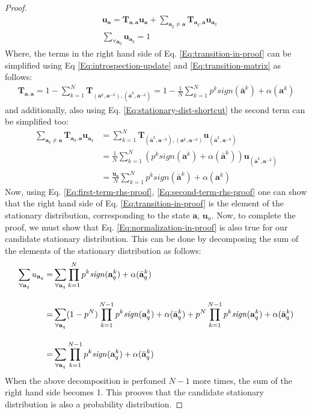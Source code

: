 \documentclass[11pt]{article}
\theoremstyle{plainCl1}
\theoremstyle{plainCl2}
\newcommand{\abf}{\mathbf{a}}
\newcommand{\T}{\mathbf{T}}
\newcommand{\ubf}{\mathbf{u}}
\begin{document}
\begin{proof}
\begin{align}
&\ubf_\abf = \T_{\abf,\abf} \ubf_\abf  + \sum_{\abf_q \neq \abf} \T_{\abf_q, \abf} \ubf_{\abf_q}  \\[10pt] 
\label{Eq:normalization-in-proof}
&\sum_{\forall \abf_q} \ubf_{\abf_q}= 1
\end{align}
Where, the terms in the right hand side of Eq. \ref{Eq:transition-in-proof} can be simplified using Eq \ref{Eq:introspection-update} and \ref{Eq:transition-matrix} as follows:
\begin{eqnarray}
\T_{\abf,\abf} = 1 - \sum_{k=1}^{N} \T_{(\abf^k, \abf^{-k}), (\bar{\abf}^k,\abf^{-k})} = 1 - \frac{1}{N} \sum_{k=1}^{N} p^k \textit{sign}(\bar{\abf}^k) + \alpha(\abf^k)
\label{Eq:first-term-rhs-proof}
\end{eqnarray} 
and additionally, also using Eq. \ref{Eq:stationary-dist-shortcut} the second term can be simplified too:
\begin{align}
\sum_{\abf_q \neq \abf} \T_{\abf_q, \abf} \ubf_{\abf_q} &= \sum_{k = 1}^N \T_{(\bar{\abf}^k,\abf^{-k}), (\abf^k, \abf^{-k})} \ubf_{(\bar{\abf}^k,\abf^{-k})} \\[10pt]
&= \frac{1}{N} \sum_{k = 1}^N \left(p^k \textit{sign}(\abf^k) +\alpha(\bar{\abf}^k) \right) \ubf_{(\bar{\abf}^k,\abf^{-k})} \\[10pt] 
\label{Eq:second-term-rhs-proof}
&= \frac{\ubf_\abf}{N} \sum_{k=1}^{N} p^k \textit{sign}(\bar{\abf}^k) + \alpha(\abf^k) 
\end{align}
Now, using Eq. \ref{Eq:first-term-rhs-proof}, \ref{Eq:second-term-rhs-proof} one can show that the right hand side of Eq. \ref{Eq:transition-in-proof} is the element of the stationary distribution, corresponding to the state $\abf$, $\ubf_a$.  Now, to complete the proof, we must show that Eq. \ref{Eq:normalization-in-proof} is also true for our candidate stationary distribution. This can be done by decomposing the sum of the elements of the stationary distribution as follows:
\begin{align}
\sum_{\forall \abf_q} u_{\abf_q} =& \displaystyle \sum_{\forall \abf_q} \prod_{k=1}^N p^k \mathit{sign}(\abf_q^k) + \alpha(\bar{\abf}_q^k) \\[10pt]
=& \displaystyle \displaystyle \sum_{\forall \abf_q} (1-p^N)  \prod_{k=1}^{N-1} p^k \mathit{sign}(\abf_q^k) + \alpha(\bar{\abf}_q^k)  + p^N  \prod_{k=1}^{N-1} p^k \mathit{sign}(\abf_q^k) + \alpha(\bar{\abf}_q^k) \\[10pt]
=& \displaystyle \sum_{\forall \abf_q} \prod_{k=1}^{N-1} p^k \mathit{sign}(\abf_q^k) + \alpha(\bar{\abf}_q^k)
\end{align}
When the above decomposition is perfomed $N-1$ more times, the sum of the right hand side becomes 1. This prooves that the candidate stationary distribution is also a probability distribution.
\end{proof}
\end{document}
